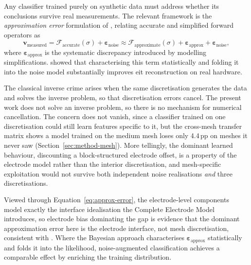 Any classifier trained purely on synthetic data must address whether its conclusions survive real measurements. The relevant framework is the \emph{approximation error} formulation of \textcite{kaipio2005statistical}, relating accurate and simplified forward operators as
\begin{equation}
\mathbf{v}_{\text{measured}} = \mathcal{F}_{\text{accurate}}(\sigma) + \boldsymbol{\varepsilon}_{\text{noise}} \approx \mathcal{F}_{\text{approximate}}(\sigma) + \boldsymbol{\varepsilon}_{\text{approx}} + \boldsymbol{\varepsilon}_{\text{noise}},
\label{eq:approx-error}
\end{equation}
where $\boldsymbol{\varepsilon}_{\text{approx}}$ is the systematic discrepancy introduced by modelling simplifications. \textcite{nissinen2008} showed that characterising this term statistically and folding it into the noise model substantially improves \gls{eit} reconstruction on real hardware.

The classical inverse crime \parencite{wirgin2004inverse, kaipio2007statistical} arises when the same discretisation generates the data and solves the inverse problem, so that discretisation errors cancel. The present work does not solve an inverse problem, so there is no mechanism for numerical cancellation. The concern does not vanish, since a classifier trained on one discretisation could still learn features specific to it, but the cross-mesh transfer matrix shows a model trained on the medium mesh loses only 4.4\,pp on meshes it never saw (Section~\ref{sec:method-mesh}). More tellingly, the dominant learned behaviour, discounting a block-structured electrode offset, is a property of the electrode model rather than the interior discretisation, and mesh-specific exploitation would not survive both independent noise realisations \emph{and} three discretisations.

Viewed through Equation~\ref{eq:approx-error}, the electrode-level components model exactly the interface idealisation the Complete Electrode Model introduces, so electrode bias dominating the gap is evidence that the dominant approximation error here is the electrode interface, not mesh discretisation, consistent with \textcite{vilhunen2002}. Where the Bayesian approach characterises $\boldsymbol{\varepsilon}_{\text{approx}}$ statistically and folds it into the likelihood, noise-augmented classification achieves a comparable effect by enriching the training distribution.

